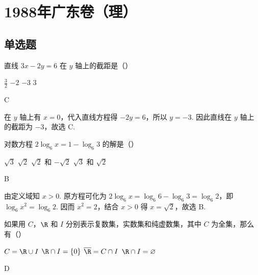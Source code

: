 \documentclass[UTF8,a4paper,oneside,11pt]{ctexbook}
\begin{document}
\mainmatter

\chapter{1988年广东卷（理）}

\section{单选题}

\begin{problem}
直线 \(3x - 2y = 6\) 在 \(y\) 轴上的截距是（\quad）

\choices
    {\(\frac{3}{2}\)}
    {\(-2\)}
    {\(-3\)}
    {\(3\)}
\end{problem}

\begin{answer}
C
\end{answer}

\begin{solution}
在 \(y\) 轴上有 \(x=0\)，代入直线方程得 \(-2y=6\)，所以 \(y=-3\). 因此直线在 \(y\) 轴上的截距为 \(-3\)，故选 C.
\end{solution}

\begin{problem}
对数方程 \(2\log_6 x = 1 - \log_6 3\) 的解是（\quad）

\choices
    {\(\sqrt{3}\)}
    {\(\sqrt{2}\)}
    {\(\sqrt{2}\) 和 \(-\sqrt{2}\)}
    {\(\sqrt{3}\) 和 \(\sqrt{2}\)}
\end{problem}

\begin{answer}
B
\end{answer}

\begin{solution}
由定义域知 \(x>0\). 原方程可化为 \(2\log_6x=\log_6 6-\log_6 3=\log_6 2\)，即 \(\log_6x^2=\log_6 2\). 因而 \(x^2=2\)，结合 \(x>0\) 得 \(x=\sqrt{2}\)，故选 B.
\end{solution}

\begin{problem}
如果用 \(C\)，\(\R\) 和 \(I\) 分别表示复数集，实数集和纯虚数集，其中 \(C\) 为全集，那么有（\quad）

\choices
    {\(C = \R \cup I\)}
    {\(\R \cap I = \{0\}\)}
    {\(\overline{\R} = C \cap I\)}
    {\(\R \cap I = \varnothing\)}
\end{problem}

\begin{answer}
D
\end{answer}
\end{document}
